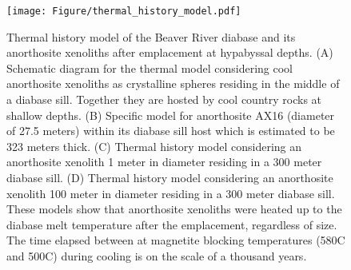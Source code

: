 \begin{figure}
\noindent\texttt{[image: Figure/thermal\_history\_model.pdf]}
\caption{\footnotesize{Thermal history model of the Beaver River diabase and its anorthosite xenoliths after emplacement at hypabyssal depths. (A) Schematic diagram for the thermal model considering cool anorthosite xenoliths as crystalline spheres residing in the middle of a diabase sill. Together they are hosted by cool country rocks at shallow depths. (B) Specific model for anorthosite AX16 (diameter of 27.5 meters) within its diabase sill host which is estimated to be 323 meters thick. (C) Thermal history model considering an anorthosite xenolith 1 meter in diameter residing in a 300 meter diabase sill. (D) Thermal history model considering an anorthosite xenolith 100 meter in diameter residing in a 300 meter diabase sill. These models show that anorthosite xenoliths were heated up to the diabase melt temperature after the emplacement, regardless of size. The time elapsed between at magnetite blocking temperatures (580\textdegree C and 500\textdegree C) during cooling is on the scale of a thousand years.}}
\label{fig:thermal_history_model}
\end{figure}


